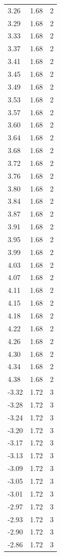 \begin{longtable}{lrr}
  3.26 & 1.68 & 2 \\
  3.29 & 1.68 & 2 \\
  3.33 & 1.68 & 2 \\
  3.37 & 1.68 & 2 \\
  3.41 & 1.68 & 2 \\
  3.45 & 1.68 & 2 \\
  3.49 & 1.68 & 2 \\
  3.53 & 1.68 & 2 \\
  3.57 & 1.68 & 2 \\
  3.60 & 1.68 & 2 \\
  3.64 & 1.68 & 2 \\
  3.68 & 1.68 & 2 \\
  3.72 & 1.68 & 2 \\
  3.76 & 1.68 & 2 \\
  3.80 & 1.68 & 2 \\
  3.84 & 1.68 & 2 \\
  3.87 & 1.68 & 2 \\
  3.91 & 1.68 & 2 \\
  3.95 & 1.68 & 2 \\
  3.99 & 1.68 & 2 \\
  4.03 & 1.68 & 2 \\
  4.07 & 1.68 & 2 \\
  4.11 & 1.68 & 2 \\
  4.15 & 1.68 & 2 \\
  4.18 & 1.68 & 2 \\
  4.22 & 1.68 & 2 \\
  4.26 & 1.68 & 2 \\
  4.30 & 1.68 & 2 \\
  4.34 & 1.68 & 2 \\
  4.38 & 1.68 & 2 \\
  -3.32 & 1.72 & 3 \\
  -3.28 & 1.72 & 3 \\
  -3.24 & 1.72 & 3 \\
  -3.20 & 1.72 & 3 \\
  -3.17 & 1.72 & 3 \\
  -3.13 & 1.72 & 3 \\
  -3.09 & 1.72 & 3 \\
  -3.05 & 1.72 & 3 \\
  -3.01 & 1.72 & 3 \\
  -2.97 & 1.72 & 3 \\
  -2.93 & 1.72 & 3 \\
  -2.90 & 1.72 & 3 \\
  -2.86 & 1.72 & 3 \\

\end{longtable}
